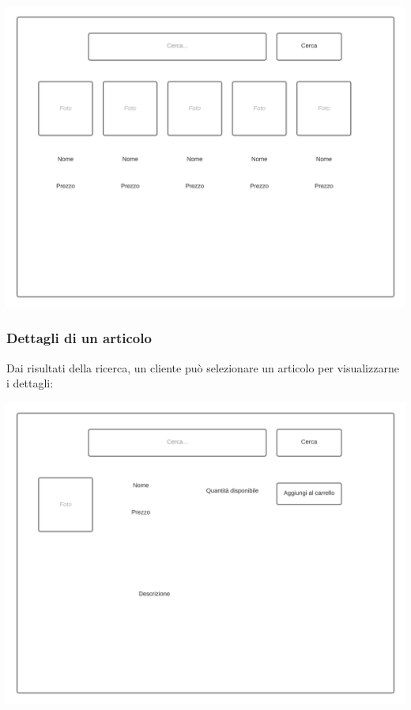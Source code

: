 \documentclass[12pt]{article}
\begin{document}
\begin{center}
\includegraphics[height=0.3\textheight]{Mockup/Cliente/Ricerca}
\end{center}

\newpage

\subsubsection{Dettagli di un articolo}
\label{mockup:clientedettagli}
Dai risultati della ricerca, un cliente può selezionare un articolo per visualizzarne i dettagli:

\begin{center}
\includegraphics[height=0.3\textheight]{Mockup/Cliente/DettagliArticolo}
\end{center}
\end{document}
